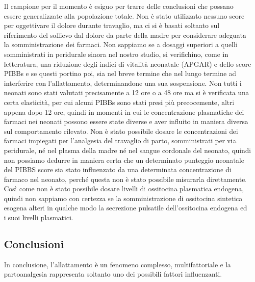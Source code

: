 \documentclass[]{article}
\begin{document}
Il campione per il momento è esiguo per trarre delle conclusioni che
possano essere generalizzate alla popolazione totale. Non è stato
utilizzato nessuno score per oggettivare il dolore durante travaglio, ma
ci si è basati soltanto sul riferimento del sollievo dal dolore da parte
della madre per considerare adeguata la somministrazione dei farmaci.
Non sappiamo se a dosaggi superiori a quelli somministrati in peridurale
sinora nel nostro studio, si verifichino, come in letteratura, una
riduzione degli indici di vitalità neonatale (APGAR) e dello score PIBBs
e se questi portino poi, sia nel breve termine che nel lungo termine ad
interferire con l'allattamento, determinandone una sua sospensione. Non
tutti i neonati sono stati valutati precisamente a 12 ore o a 48 ore ma
si è verificata una certa elasticità, per cui alcuni PIBBs sono stati
presi più precocemente, altri appena dopo 12 ore, quindi in momenti in
cui le concentrazione plasmatiche dei farmaci nei neonati possono essere
state diverse e aver influito in maniera diversa sul comportamento
rilevato. Non è stato possibile dosare le concentrazioni dei farmaci
impiegati per l'analgesia del travaglio di parto, somministrati per via
peridurale, né nel plasma della madre né nel sangue cordonale del
neonato, quindi non possiamo dedurre in maniera certa che un determinato
punteggio neonatale del PIBBS score sia stato influenzato da una
determinata concentrazione di farmaco nel neonato, perché questa non è
stato possibile misurarla direttamente. Così come non è stato possibile
dosare livelli di ossitocina plasmatica endogena, quindi non sappiamo
con certezza se la somministrazione di ossitocina sintetica esogena
alteri in qualche modo la secrezione pulsatile dell'ossitocina endogena
ed i suoi livelli plasmatici.

\hypertarget{conclusioni}{%
\subsection{Conclusioni}\label{conclusioni}}

In conclusione, l'allattamento è un fenomeno complesso, multifattoriale
e la partoanalgesia rappresenta soltanto uno dei possibili fattori
influenzanti.
\end{document}
